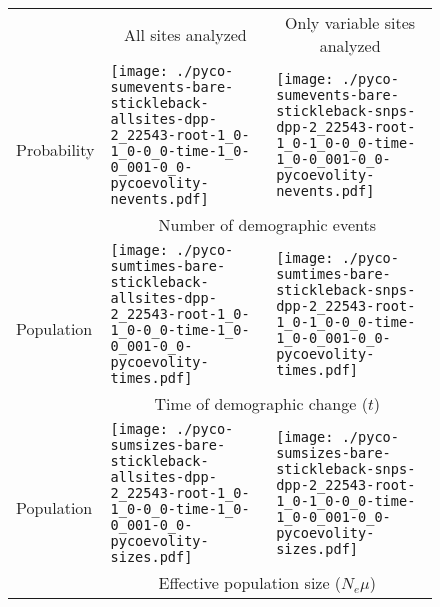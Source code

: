 \documentclass[border=10pt,varwidth=30cm]{standalone}
\begin{document}
\begin{figure}
    \centering
    \begin{tabular}{@{}lll@{}}
        & \multicolumn{1}{c}{\LARGE All sites analyzed} & \multicolumn{1}{c}{\LARGE Only variable sites analyzed} \\[1ex]
        \multirow{2}{*}[8em]{\begin{sideways}\large Probability\end{sideways}}
        & \texttt{[image: ./pyco-sumevents-bare-stickleback-allsites-dpp-2\_22543-root-1\_0-1\_0-0\_0-time-1\_0-0\_001-0\_0-pycoevolity-nevents.pdf]}
        & \texttt{[image: ./pyco-sumevents-bare-stickleback-snps-dpp-2\_22543-root-1\_0-1\_0-0\_0-time-1\_0-0\_001-0\_0-pycoevolity-nevents.pdf]} \\
        & \multicolumn{2}{c}{\large Number of demographic events} \\[1ex]
        \multirow{2}{*}[8em]{\begin{sideways}\large Population\end{sideways}}
        & \texttt{[image: ./pyco-sumtimes-bare-stickleback-allsites-dpp-2\_22543-root-1\_0-1\_0-0\_0-time-1\_0-0\_001-0\_0-pycoevolity-times.pdf]}
        & \texttt{[image: ./pyco-sumtimes-bare-stickleback-snps-dpp-2\_22543-root-1\_0-1\_0-0\_0-time-1\_0-0\_001-0\_0-pycoevolity-times.pdf]} \\
        & \multicolumn{2}{c}{\large Time of demographic change ($t$)} \\[1ex]
        \multirow{2}{*}[8em]{\begin{sideways}\large Population\end{sideways}}
        & \texttt{[image: ./pyco-sumsizes-bare-stickleback-allsites-dpp-2\_22543-root-1\_0-1\_0-0\_0-time-1\_0-0\_001-0\_0-pycoevolity-sizes.pdf]}
        & \texttt{[image: ./pyco-sumsizes-bare-stickleback-snps-dpp-2\_22543-root-1\_0-1\_0-0\_0-time-1\_0-0\_001-0\_0-pycoevolity-sizes.pdf]} \\
        & \multicolumn{2}{c}{\large Effective population size ($N_e\mu$)}
    \end{tabular}
\end{figure}
\end{document}
